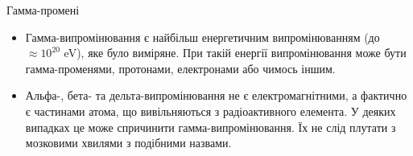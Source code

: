 {\Large Гамма-промені}
\begin{itemize}

\item Гамма-випромінювання є найбільш енергетичним випромінюванням (до $\approx 10^{20}$ eV), яке було виміряне. При такій енергії випромінювання може бути гамма-променями, протонами, електронами або чимось іншим.

\item Альфа-, бета- та дельта-випромінювання не є електромагнітними, а фактично є частинами атома, що вивільняються з радіоактивного елемента. У деяких випадках це може спричинити гамма-випромінювання. Їх не слід плутати з мозковими хвилями з подібними назвами.

\end{itemize}
